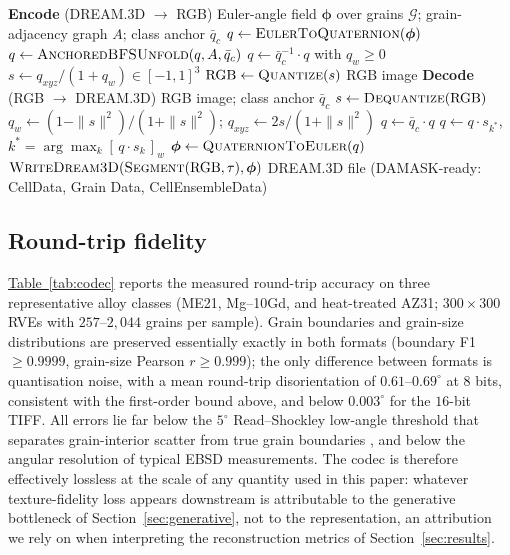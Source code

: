 \documentclass[preprint,12pt]{elsarticle}
\newcommand{\tabref}[1]{\hyperref[#1]{Table~\ref*{#1}}}
\begin{document}
\begin{algorithm}[t]
\caption{Orientation codec round-trip (DREAM.3D $\leftrightarrow$ RGB).}
\label{alg:codec}
\begin{algorithmic}[1]
\Statex \textbf{Encode} (DREAM.3D $\rightarrow$ RGB)
\Require Euler-angle field $\bm{\phi}$ over grains $\mathcal{G}$; grain-adjacency graph $A$; class anchor $\bar{q}_c$
\State $q \gets \textproc{EulerToQuaternion}(\bm{\phi})$ 
\State $q \gets \textproc{AnchoredBFSUnfold}(q, A, \bar{q}_c)$ 
\State $q \gets \bar{q}_c^{-1} \cdot q$ with $q_w \geq 0$ 
\State $s \gets q_{xyz}/(1+q_w) \in [-1,1]^3$ 
\State $\mathrm{RGB} \gets \textproc{Quantize}(s)$ 
\Ensure RGB image
\Statex
\Statex \textbf{Decode} (RGB $\rightarrow$ DREAM.3D)
\Require RGB image; class anchor $\bar{q}_c$
\State $s \gets \textproc{Dequantize}(\mathrm{RGB})$
\State $q_w \gets (1-\|s\|^2)/(1+\|s\|^2)$; \; $q_{xyz} \gets 2s/(1+\|s\|^2)$ 
\State $q \gets \bar{q}_c \cdot q$
\State $q \gets q \cdot s_{k^{*}}$, \; $k^{*} = \arg\max_{k} [\,q \cdot s_k\,]_w$ 
\State $\bm{\phi} \gets \textproc{QuaternionToEuler}(q)$
\State $\textproc{WriteDream3D}(\textproc{Segment}(\mathrm{RGB}, \tau), \bm{\phi})$ 
\Ensure DREAM.3D file (DAMASK-ready: CellData, Grain Data, CellEnsembleData)
\end{algorithmic}
\end{algorithm}

\subsection{Round-trip fidelity}
\label{sec:codec-fidelity}

\tabref{tab:codec} reports the measured round-trip accuracy on three representative alloy classes (ME21, Mg--10Gd, and heat-treated AZ31; $300 \times 300$ RVEs with $257$--$2{,}044$ grains per sample). Grain boundaries and grain-size distributions are preserved essentially exactly in both formats (boundary F1 $\geq 0.9999$, grain-size Pearson $r \geq 0.999$); the only difference between formats is quantisation noise, with a mean round-trip disorientation of $0.61$--$0.69^{\circ}$ at $8$ bits, consistent with the first-order bound above, and below $0.003^{\circ}$ for the $16$-bit TIFF. All errors lie far below the $5^{\circ}$ Read--Shockley low-angle threshold that separates grain-interior scatter from true grain boundaries \cite{readshockley1950}, and below the angular resolution of typical EBSD measurements. The codec is therefore effectively lossless at the scale of any quantity used in this paper: whatever texture-fidelity loss appears downstream is attributable to the generative bottleneck of Section~\ref{sec:generative}, not to the representation, an attribution we rely on when interpreting the reconstruction metrics of Section~\ref{sec:results}.
\end{document}
